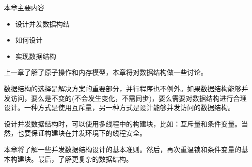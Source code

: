 
本章主要内容

\begin{itemize}
    \item 设计并发数据构结
    \item 如何设计
    \item 实现数据结构
\end{itemize}

上一章了解了原子操作和内存模型，本章将对数据结构做一些讨论。

数据结构的选择是解决方案的重要部分，并行程序也不例外。如果数据结构能够并发访问，要么是不变的(不会发生变化，不需同步)，要么需要对数据结构进行合理设计。一种方式是使用互斥量，另一种方式是设计能够并发访问的数据结构。

设计并发数据结构时，可以使用多线程中的构建块，比如：互斥量和条件变量。当然，也要保证构建块在并发环境下的线程安全。

本章将了解一些并发数据结构设计的基本准则。然后，再次重温锁和条件变量的基本构建块。最后，了解更复杂的数据结构。

